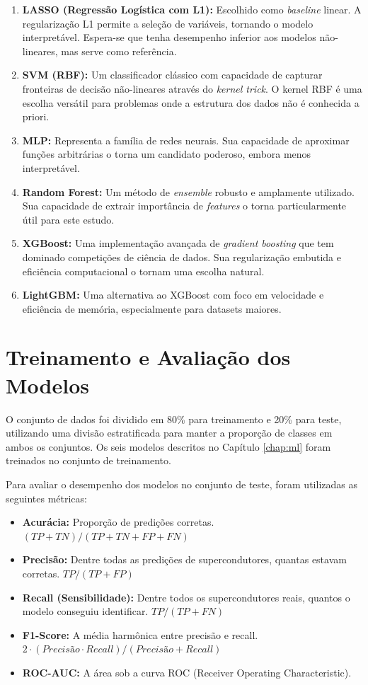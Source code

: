 \documentclass[12pt, a4paper, oneside]{report}
\begin{document}
\begin{enumerate}
    \item \textbf{LASSO (Regressão Logística com L1):} Escolhido como \textit{baseline} linear. A regularização L1 permite a seleção de variáveis, tornando o modelo interpretável. Espera-se que tenha desempenho inferior aos modelos não-lineares, mas serve como referência.
    \item \textbf{SVM (RBF):} Um classificador clássico com capacidade de capturar fronteiras de decisão não-lineares através do \textit{kernel trick}. O kernel RBF é uma escolha versátil para problemas onde a estrutura dos dados não é conhecida a priori.
    \item \textbf{MLP:} Representa a família de redes neurais. Sua capacidade de aproximar funções arbitrárias o torna um candidato poderoso, embora menos interpretável.
    \item \textbf{Random Forest:} Um método de \textit{ensemble} robusto e amplamente utilizado. Sua capacidade de extrair importância de \textit{features} o torna particularmente útil para este estudo.
    \item \textbf{XGBoost:} Uma implementação avançada de \textit{gradient boosting} que tem dominado competições de ciência de dados. Sua regularização embutida e eficiência computacional o tornam uma escolha natural.
    \item \textbf{LightGBM:} Uma alternativa ao XGBoost com foco em velocidade e eficiência de memória, especialmente para datasets maiores.
\end{enumerate}

\section{Treinamento e Avaliação dos Modelos}

O conjunto de dados foi dividido em 80\% para treinamento e 20\% para teste, utilizando uma divisão estratificada para manter a proporção de classes em ambos os conjuntos. Os seis modelos descritos no Capítulo \ref{chap:ml} foram treinados no conjunto de treinamento.

Para avaliar o desempenho dos modelos no conjunto de teste, foram utilizadas as seguintes métricas:

\begin{itemize}
    \item \textbf{Acurácia:} Proporção de predições corretas. $(TP + TN) / (TP + TN + FP + FN)$
    \item \textbf{Precisão:} Dentre todas as predições de supercondutores, quantas estavam corretas. $TP / (TP + FP)$
    \item \textbf{Recall (Sensibilidade):} Dentre todos os supercondutores reais, quantos o modelo conseguiu identificar. $TP / (TP + FN)$
    \item \textbf{F1-Score:} A média harmônica entre precisão e recall. $2 \cdot (Precisão \cdot Recall) / (Precisão + Recall)$
    \item \textbf{ROC-AUC:} A área sob a curva ROC (Receiver Operating Characteristic).
\end{itemize}
\end{document}
